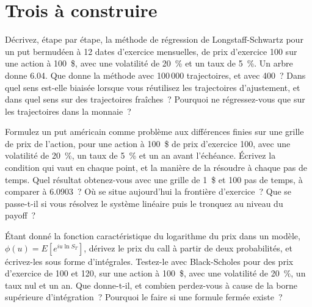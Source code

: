 \section{Trois à construire}

\begin{question}\label{iq:iv2:pricing-and-numerics:48}
Décrivez, étape par étape, la méthode de régression de Longstaff-Schwartz pour un put bermudéen à 12 dates d'exercice mensuelles, de prix d'exercice 100 sur une action à 100~\$, avec une volatilité de 20~\% et un taux de 5~\%. Un arbre donne 6.04. Que donne la méthode avec 100\,000 trajectoires, et avec 400~? Dans quel sens est-elle biaisée lorsque vous réutilisez les trajectoires d'ajustement, et dans quel sens sur des trajectoires fraîches~? Pourquoi ne régressez-vous que sur les trajectoires dans la monnaie~?
\end{question}

\begin{question}\label{iq:iv2:pricing-and-numerics:49}
Formulez un put américain comme problème aux différences finies sur une grille de prix de l'action, pour une action à 100~\$ de prix d'exercice 100, avec une volatilité de 20~\%, un taux de 5~\% et un an avant l'échéance. Écrivez la condition qui vaut en chaque point, et la manière de la résoudre à chaque pas de temps. Quel résultat obtenez-vous avec une grille de 1~\$ et 100 pas de temps, à comparer à 6.0903~? Où se situe aujourd'hui la frontière d'exercice~? Que se passe-t-il si vous résolvez le système linéaire puis le tronquez au niveau du payoff~?
\end{question}

\begin{question}\label{iq:iv2:pricing-and-numerics:50}
Étant donné la fonction caractéristique du logarithme du prix dans un modèle, $\phi(u) = E[e^{iu\ln S_T}]$, dérivez le prix du call à partir de deux probabilités, et écrivez-les sous forme d'intégrales. Testez-le avec Black-Scholes pour des prix d'exercice de 100 et 120, sur une action à 100~\$, avec une volatilité de 20~\%, un taux nul et un an. Que donne-t-il, et combien perdez-vous à cause de la borne supérieure d'intégration~? Pourquoi le faire si une formule fermée existe~?
\end{question}
